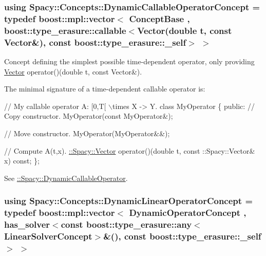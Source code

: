 \subsubsection[{Dynamic\+Callable\+Operator\+Concept}]{\setlength{\rightskip}{0pt plus 5cm}using {\bf Spacy\+::\+Concepts\+::\+Dynamic\+Callable\+Operator\+Concept} = typedef boost\+::mpl\+::vector$<$ Concept\+Base , boost\+::type\+\_\+erasure\+::callable$<$Vector(double t, const Vector\&), const boost\+::type\+\_\+erasure\+::\+\_\+self$>$ $>$}\label{group__ConceptGroup_ga30692db093ead5a1a074905363a2f043_ga30692db093ead5a1a074905363a2f043}


Concept defining the simplest possible time-\/dependent operator, only providing \hyperlink{classSpacy_1_1Vector}{Vector} operator()(double t, const Vector\&). 

\label{group__ConceptGroup_ga30692db093ead5a1a074905363a2f043_DynamicCallableOperatorConceptAnchor}%
\hypertarget{group__ConceptGroup_ga30692db093ead5a1a074905363a2f043_DynamicCallableOperatorConceptAnchor}{}%
The minimal signature of a time-\/dependent callable operator is\+: 
\begin{DoxyCode}
\textcolor{comment}{// My callable operator A: [0,T[ \(\backslash\)times X -> Y.}
\textcolor{keyword}{class }MyOperator
\{
\textcolor{keyword}{public}:
  \textcolor{comment}{// Copy constructor.}
  MyOperator(\textcolor{keyword}{const} MyOperator&);

  \textcolor{comment}{// Move constructor.}
  MyOperator(MyOperator&&);

  \textcolor{comment}{// Compute A(t,x).}
  \hyperlink{classSpacy_1_1Vector}{::Spacy::Vector} operator()(\textcolor{keywordtype}{double} t, const ::Spacy::Vector& x) \textcolor{keyword}{const};
\};
\end{DoxyCode}


See \hyperlink{group__SpacyGroup_ga750d55072f7a3a16a1263961147333c0_DynamicCallableOperatorAnchor}{\+:\+:Spacy\+:\+:Dynamic\+Callable\+Operator}. \hypertarget{group__ConceptGroup_ga015b0d099011a2ef73a16aa9b36a7346_ga015b0d099011a2ef73a16aa9b36a7346}{}
\subsubsection[{Dynamic\+Linear\+Operator\+Concept}]{\setlength{\rightskip}{0pt plus 5cm}using {\bf Spacy\+::\+Concepts\+::\+Dynamic\+Linear\+Operator\+Concept} = typedef boost\+::mpl\+::vector$<$ Dynamic\+Operator\+Concept , has\+\_\+solver$<$const boost\+::type\+\_\+erasure\+::any$<$Linear\+Solver\+Concept$>$\&(), const boost\+::type\+\_\+erasure\+::\+\_\+self$>$ $>$}\label{group__ConceptGroup_ga015b0d099011a2ef73a16aa9b36a7346_ga015b0d099011a2ef73a16aa9b36a7346}


